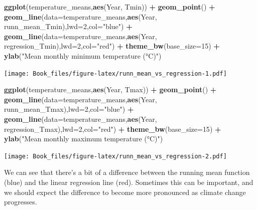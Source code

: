 \documentclass[
]{book}
\newenvironment{Shaded}{\begin{snugshade}}{\end{snugshade}}
\newcommand{\DataTypeTok}[1]{\textcolor[rgb]{0.13,0.29,0.53}{#1}}
\newcommand{\DecValTok}[1]{\textcolor[rgb]{0.00,0.00,0.81}{#1}}
\newcommand{\KeywordTok}[1]{\textcolor[rgb]{0.13,0.29,0.53}{\textbf{#1}}}
\newcommand{\NormalTok}[1]{#1}
\newcommand{\OperatorTok}[1]{\textcolor[rgb]{0.81,0.36,0.00}{\textbf{#1}}}
\newcommand{\StringTok}[1]{\textcolor[rgb]{0.31,0.60,0.02}{#1}}
\begin{document}
\begin{Shaded}
\begin{Highlighting}[]
\KeywordTok{ggplot}\NormalTok{(temperature_means,}\KeywordTok{aes}\NormalTok{(Year, Tmin)) }\OperatorTok{+}\StringTok{ }
\StringTok{  }\KeywordTok{geom_point}\NormalTok{() }\OperatorTok{+}\StringTok{ }
\StringTok{  }\KeywordTok{geom_line}\NormalTok{(}\DataTypeTok{data=}\NormalTok{temperature_means,}\KeywordTok{aes}\NormalTok{(Year, runn_mean_Tmin),}\DataTypeTok{lwd=}\DecValTok{2}\NormalTok{,}\DataTypeTok{col=}\StringTok{"blue"}\NormalTok{) }\OperatorTok{+}\StringTok{ }
\StringTok{  }\KeywordTok{geom_line}\NormalTok{(}\DataTypeTok{data=}\NormalTok{temperature_means,}\KeywordTok{aes}\NormalTok{(Year, regression_Tmin),}\DataTypeTok{lwd=}\DecValTok{2}\NormalTok{,}\DataTypeTok{col=}\StringTok{"red"}\NormalTok{) }\OperatorTok{+}
\StringTok{  }\KeywordTok{theme_bw}\NormalTok{(}\DataTypeTok{base_size=}\DecValTok{15}\NormalTok{) }\OperatorTok{+}
\StringTok{  }\KeywordTok{ylab}\NormalTok{(}\StringTok{"Mean monthly minimum temperature (°C)"}\NormalTok{)}
\end{Highlighting}
\end{Shaded}

\texttt{[image: Book\_files/figure-latex/runn\_mean\_vs\_regression-1.pdf]}

\begin{Shaded}
\begin{Highlighting}[]
\KeywordTok{ggplot}\NormalTok{(temperature_means,}\KeywordTok{aes}\NormalTok{(Year, Tmax)) }\OperatorTok{+}\StringTok{ }
\StringTok{  }\KeywordTok{geom_point}\NormalTok{() }\OperatorTok{+}\StringTok{ }
\StringTok{  }\KeywordTok{geom_line}\NormalTok{(}\DataTypeTok{data=}\NormalTok{temperature_means,}\KeywordTok{aes}\NormalTok{(Year, runn_mean_Tmax),}\DataTypeTok{lwd=}\DecValTok{2}\NormalTok{,}\DataTypeTok{col=}\StringTok{"blue"}\NormalTok{) }\OperatorTok{+}\StringTok{ }
\StringTok{  }\KeywordTok{geom_line}\NormalTok{(}\DataTypeTok{data=}\NormalTok{temperature_means,}\KeywordTok{aes}\NormalTok{(Year, regression_Tmax),}\DataTypeTok{lwd=}\DecValTok{2}\NormalTok{,}\DataTypeTok{col=}\StringTok{"red"}\NormalTok{) }\OperatorTok{+}
\StringTok{  }\KeywordTok{theme_bw}\NormalTok{(}\DataTypeTok{base_size=}\DecValTok{15}\NormalTok{) }\OperatorTok{+}
\StringTok{  }\KeywordTok{ylab}\NormalTok{(}\StringTok{"Mean monthly maximum temperature (°C)"}\NormalTok{)}
\end{Highlighting}
\end{Shaded}

\texttt{[image: Book\_files/figure-latex/runn\_mean\_vs\_regression-2.pdf]}

We can see that there's a bit of a difference between the running mean function (blue) and the linear regression line (red). Sometimes this can be important, and we should expect the difference to become more pronounced as climate change progresses.
\end{document}
